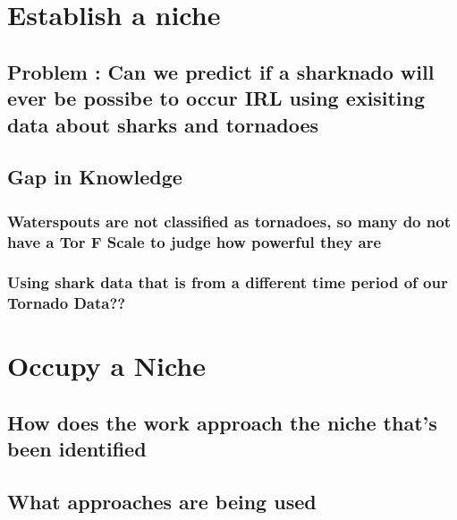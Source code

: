 \documentclass[
  letterpaper,
  DIV=11,
  numbers=noendperiod]{scrreprt}
\begin{document}
\section{Establish a niche}\label{establish-a-niche}

\subsection{Problem : Can we predict if a sharknado will ever be possibe
to occur IRL using exisiting data about sharks and
tornadoes}\label{problem-can-we-predict-if-a-sharknado-will-ever-be-possibe-to-occur-irl-using-exisiting-data-about-sharks-and-tornadoes}

\subsection{Gap in Knowledge}\label{gap-in-knowledge}

\subsubsection{Waterspouts are not classified as tornadoes, so many do
not have a Tor F Scale to judge how powerful they
are}\label{waterspouts-are-not-classified-as-tornadoes-so-many-do-not-have-a-tor-f-scale-to-judge-how-powerful-they-are}

\subsubsection{Using shark data that is from a different time period of
our Tornado
Data??}\label{using-shark-data-that-is-from-a-different-time-period-of-our-tornado-data}

\section{Occupy a Niche}\label{occupy-a-niche}

\subsection{How does the work approach the niche that's been
identified}\label{how-does-the-work-approach-the-niche-thats-been-identified}

\subsection{What approaches are being
used}\label{what-approaches-are-being-used}
\end{document}

